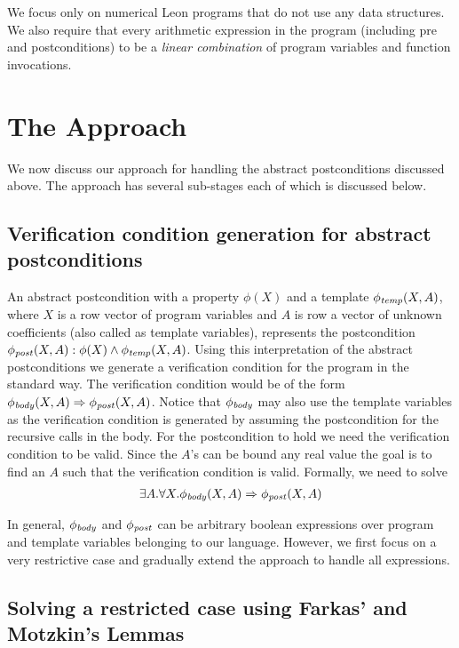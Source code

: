 \documentclass[a4paper,10pt]{article}
\begin{document}
We focus only on numerical Leon programs that do not use any data structures. We also require that every arithmetic expression in the program (including pre and postconditions) to be a \emph{linear combination} of program variables and function invocations.

\section{The Approach}

We now discuss our approach for handling the abstract postconditions discussed above.
The approach has several sub-stages each of which is discussed below.

\subsection{Verification condition generation for abstract postconditions}

An abstract postcondition with a property $\phi(X)$ and a template $\mathit{\phi_{temp}}(X,A)$,
where $X$ is a row vector of program variables and $A$ is row a vector of unknown coefficients (also called as template variables),
represents the postcondition $\mathit{\phi_{post}}(X,A): \phi(X) \wedge \mathit{\phi_{temp}}(X,A)$.
Using this interpretation of the abstract postconditions we generate a verification condition 
for the program in the standard way. 
The verification condition would be of the form $\mathit{\phi_{body}}(X,A) \Rightarrow \mathit{\phi_{post}}(X,A)$. Notice that $\mathit{\phi_{body}}$ may also use the template variables as the verification condition is generated by assuming the postcondition for the recursive calls in the body.
For the postcondition to hold we need the verification condition to be valid. Since the $A$'s can be bound any real value the goal is to find an $A$ such that the verification condition is valid. Formally, we need to solve
%
\begin{align}
\exists A. \forall X. \mathit{\phi_{body}}(X,A) \Rightarrow \mathit{\phi_{post}}(X,A)
\label{eq:tempvc}
\end{align}

In general, $\mathit{\phi_{body}}$ and $\mathit{\phi_{post}}$ can be arbitrary boolean expressions over program and template variables belonging to our language. However, we first focus on a very restrictive case and gradually extend the approach to handle all expressions.

\subsection{Solving a restricted case using Farkas' and Motzkin's Lemmas}
\end{document}
